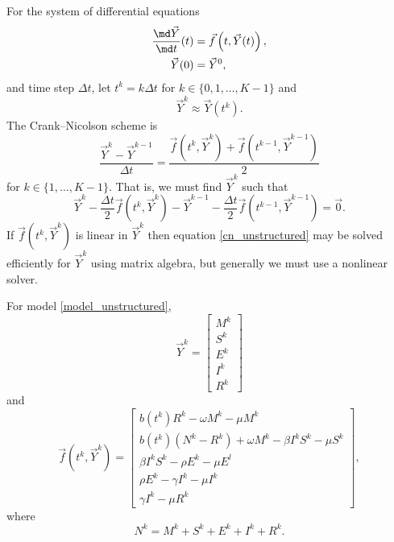 \documentclass{jpmarticle}
\begin{document}
For the system of differential equations
\begin{equation}
  \begin{split}
    \frac{\md \vec{Y}}{\md t}(t)
    &= \vec{f}\left(t, \vec{Y}(t)\right),
    \\
    \vec{Y}(0) &= \vec{Y}^0,
  \end{split}
\end{equation}
and time step $\Delta t$, let $t^k = k \Delta t$ for
$k \in \{0, 1, \ldots, K - 1\}$ and
\begin{equation}
  \vec{Y}^k \approx \vec{Y}(t^k).
\end{equation}
The Crank--Nicolson scheme is
\begin{equation}
  \frac{\vec{Y}^k - \vec{Y}^{k - 1}}{\Delta t}
  = \frac{
    \vec{f}\left(t^k, \vec{Y}^k\right)
    + \vec{f}\left(t^{k - 1}, \vec{Y}^{k - 1}\right)
  }{2}
\end{equation}
for $k \in \{1, \ldots, K - 1\}$.
That is, we must find $\vec{Y}^k$ such that
\begin{equation}
  \label{cn_unstructured}
  \vec{Y}^k
  - \frac{\Delta t}{2}
  \vec{f}\left(t^k, \vec{Y}^k\right)
  - \vec{Y}^{k - 1}
  - \frac{\Delta t}{2}
  \vec{f}\left(t^{k - 1}, \vec{Y}^{k - 1}\right)
  = \vec{0}.
\end{equation}
If $\vec{f}\left(t^k, \vec{Y}^k\right)$ is linear in $\vec{Y}^k$
then equation \eqref{cn_unstructured} may be solved efficiently for
$\vec{Y}^k$ using matrix algebra, but generally we must use a
nonlinear solver.

For model \eqref{model_unstructured},
\begin{equation}
  \vec{Y}^k =
  \begin{bmatrix}
    M^k \\ S^k \\ E^k \\ I^k \\ R^k
  \end{bmatrix}
\end{equation}
and
\begin{equation}
  \vec{f}\left(t^k, \vec{Y}^k\right) =
  \begin{bmatrix}
    b\left(t^k\right) R^k
    - \omega M^k
    - \mu M^k
    \\
    b\left(t^k\right) \left(N^k - R^k\right)
    + \omega M^k
    - \beta I^k S^k
    - \mu S^k
    \\
    \beta I^k S^k
    - \rho E^k
    - \mu E^l
    \\
    \rho E^k
    - \gamma I^k
    - \mu I^k
    \\
    \gamma I^k
    - \mu R^k
  \end{bmatrix},
\end{equation}
where
\begin{equation}
  \label{eq:1}
  N^k = M^k + S^k + E^k + I^k + R^k.
\end{equation}
\end{document}

